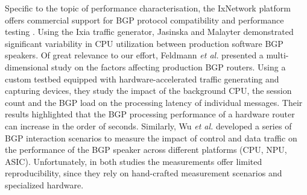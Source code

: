 Specific to the topic of performance characterisation, the IxNetwork platform
offers commercial support for BGP protocol compatibility and performance
testing \cite{ixia2004}. Using the Ixia traffic generator, Jasinska and
Malayter \cite{Jasinska2010} demonstrated significant variability in CPU
utilization between production software BGP speakers. Of great relevance to our
effort, Feldmann \textit{et al.}\cite{feldmann2004} presented a multi-dimensional study on
the factors affecting production BGP routers. Using a custom testbed equipped
with hardware-accelerated traffic generating and capturing devices, they study
the impact of the background CPU, the session count and the BGP load on the
processing latency of individual messages. Their results highlighted that the
BGP processing performance of a hardware router can increase in the order of
seconds. Similarly, Wu \textit{et al.}\cite{wu2007} developed a series of BGP interaction
scenarios to measure the impact of control and data traffic on the performance
of the BGP speaker across different platforms (CPU, NPU, ASIC).  Unfortunately,
in both studies the measurements offer limited reproducibility, since they rely
on hand-crafted measurement scenarios and specialized hardware.
